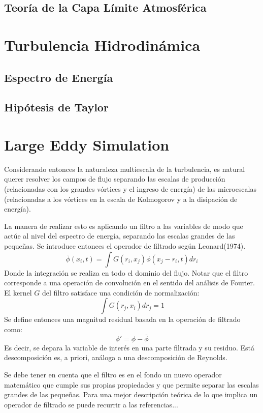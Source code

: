 \subsection{Teoría de la Capa Límite Atmosférica}
\section{Turbulencia Hidrodinámica}
\subsection{Espectro de Energía}
\subsection{Hipótesis de Taylor}
\section{Large Eddy Simulation}
Considerando entonces la naturaleza multiescala de la turbulencia, es natural querer resolver los campos de flujo separando las escalas de producción (relacionadas con los grandes vórtices y el ingreso de energía) de las microescalas (relacionadas a los vórtices en la escala de Kolmogorov y a la disipación de energía). 

La manera de realizar esto es aplicando un filtro a las variables de modo que actúe al nivel del espectro de energía, separando las escalas grandes de las pequeñas. Se introduce entonces el operador de filtrado según Leonard(1974).
\begin{equation}
\overline{\phi}(x_i,t) = \int G(r_i,x_j)\phi(x_j-r_i,t)dr_i
\end{equation}
Donde la integración se realiza en todo el dominio del flujo. Notar que el filtro corresponde a una operación de convolución en el sentido del análisis de Fourier. El kernel $G$ del filtro satisface una condición de normalización:
\begin{equation}
\int G(r_j,x_i)dr_j = 1
\end{equation}
Se define entonces una magnitud residual basada en la operación de filtrado como:
\begin{equation}
\phi' = \phi - \overline{\phi}
\end{equation}
Es decir, se depara la variable de interés en una parte filtrada y su residuo. Está descomposición es, a priori, análoga a una descomposición de Reynolds.

Se debe tener en cuenta que el filtro es en el fondo un nuevo operador matemático que cumple sus propias propiedades y que permite separar las escalas grandes de las pequeñas. Para una mejor descripción teórica de lo que implica un operador de filtrado se puede recurrir a las referencias...

